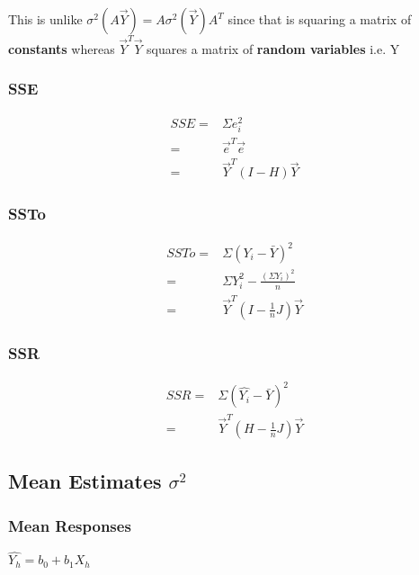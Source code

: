\documentclass[11pt]{article}
\begin{document}
This is unlike \(\sigma^2 (A \vec{Y}) = A \sigma^2 (\vec{Y}) A^T\) since that is
squaring a matrix of \textbf{constants} whereas \(\vec{Y}^T \vec{Y}\) squares a matrix
of \textbf{random variables} i.e. Y

\subsubsection{SSE}
\label{sec:org4844979}
\begin{equation}
  \begin{split}
   SSE = & \Sigma e_i^2\\
       = & \vec{e}^T \vec{e}\\
       = & \vec{Y}^T (I - H) \vec{Y}
  \end{split}
\end{equation}

\subsubsection{SSTo}
\label{sec:orga3cb39e}

\begin{equation}
  \begin{split}
    SSTo = & \Sigma (Y_i - \bar{Y})^2\\
         = & \Sigma Y_i^2 - \frac{(\Sigma Y_i)^2}{n}\\
         = & \vec{Y}^T (I - \frac{1}{n} J) \vec{Y}
  \end{split}
\end{equation}

\subsubsection{SSR}
\label{sec:orgaa38f09}

\begin{equation}
  \begin{split}
    SSR = & \Sigma (\hat{Y_i} - \bar{Y})^2\\
        = & \vec{Y}^T (H - \frac{1}{n} J) \vec{Y}
  \end{split}
\end{equation}

\subsection{Mean Estimates \(\sigma^2\)}
\label{sec:orge65d65d}
\subsubsection{Mean Responses}
\label{sec:orgbdcf349}
\(\hat{Y_h} = b_0 + b_1 X_h\)
\end{document}
